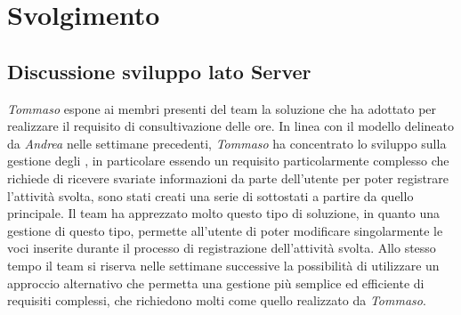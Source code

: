 \section{Svolgimento}
\subsection{Discussione sviluppo lato Server}
\textit{Tommaso} espone ai membri presenti del team la soluzione che ha adottato per realizzare il requisito di consultivazione delle ore. In linea con il modello delineato da \textit{Andrea} nelle settimane precedenti, \textit{Tommaso} ha concentrato lo sviluppo sulla gestione degli , in particolare essendo un requisito particolarmente complesso che richiede di ricevere svariate informazioni da parte dell'utente per poter registrare l'attività svolta, sono stati creati una serie di sottostati a partire da quello principale. \newline
Il team ha apprezzato molto questo tipo di soluzione, in quanto una gestione di questo tipo, permette all'utente di poter modificare singolarmente le voci inserite durante il processo di registrazione dell'attività svolta. Allo stesso tempo il team si riserva nelle settimane successive la possibilità di utilizzare un approccio alternativo che permetta una gestione più semplice ed efficiente di requisiti complessi, che richiedono molti  come quello realizzato da \textit{Tommaso}.

